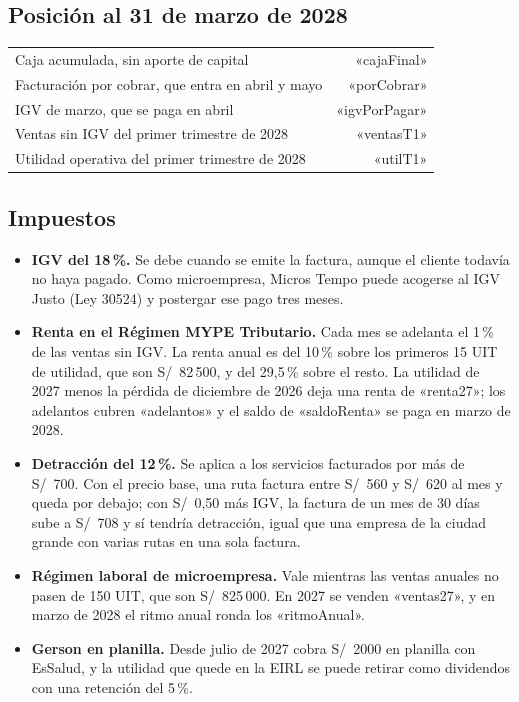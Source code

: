 \documentclass[10.5pt,a4paper]{article}
\begin{document}
\subsection{Posición al 31 de marzo de 2028}

\begin{center}
\begin{tabularx}{0.8\linewidth}{@{}Xr@{}}
\toprule
Caja acumulada, sin aporte de capital & «cajaFinal»\\
Facturación por cobrar, que entra en abril y mayo & «porCobrar»\\
IGV de marzo, que se paga en abril & «igvPorPagar»\\
Ventas sin IGV del primer trimestre de 2028 & «ventasT1»\\
Utilidad operativa del primer trimestre de 2028 & «utilT1»\\
\bottomrule
\end{tabularx}
\end{center}

\subsection{Impuestos}

\begin{itemize}
\item \textbf{IGV del 18\,\%.} Se debe cuando se emite la factura, aunque el cliente todavía no haya pagado. Como microempresa, Micros Tempo puede acogerse al IGV Justo (Ley 30524) y postergar ese pago tres meses.
\item \textbf{Renta en el Régimen MYPE Tributario.} Cada mes se adelanta el 1\,\% de las ventas sin IGV. La renta anual es del 10\,\% sobre los primeros 15 UIT de utilidad, que son S/~82\,500, y del 29,5\,\% sobre el resto. La utilidad de 2027 menos la pérdida de diciembre de 2026 deja una renta de «renta27»; los adelantos cubren «adelantos» y el saldo de «saldoRenta» se paga en marzo de 2028.
\item \textbf{Detracción del 12\,\%.} Se aplica a los servicios facturados por más de S/~700. Con el precio base, una ruta factura entre S/~560 y S/~620 al mes y queda por debajo; con S/~0,50 más IGV, la factura de un mes de 30 días sube a S/~708 y sí tendría detracción, igual que una empresa de la ciudad grande con varias rutas en una sola factura.
\item \textbf{Régimen laboral de microempresa.} Vale mientras las ventas anuales no pasen de 150 UIT, que son S/~825\,000. En 2027 se venden «ventas27», y en marzo de 2028 el ritmo anual ronda los «ritmoAnual».
\item \textbf{Gerson en planilla.} Desde julio de 2027 cobra S/~2000 en planilla con EsSalud, y la utilidad que quede en la EIRL se puede retirar como dividendos con una retención del 5\,\%.
\end{itemize}
\end{document}
